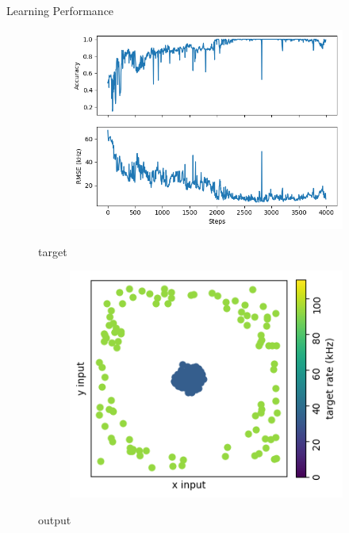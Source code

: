 \documentclass[12pt, aspectratio=169]{beamer}
\begin{document}
\begin{frame}{Learning Performance}
\begin{figure}[!htb]
        \begin{figure}
            \includegraphics[scale=0.6]{mfp/learning_process/learning_performance.png}
        \end{figure}
  	\endminipage\hfill
  	\centering
        target
        \begin{figure}
            \includegraphics[scale=0.25]{mfp/targets.png}
            \label{fig:my_label}
        \end{figure}
        output
        \begin{figure}

\end{figure}
\end{figure}
\end{frame}
\end{document}

